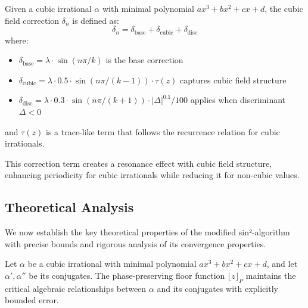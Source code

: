 \begin{definition}
Given a cubic irrational $\alpha$ with minimal polynomial $ax^3 + bx^2 + cx + d$, the cubic field correction $\delta_n$ is defined as:
\begin{equation}
\delta_n = \delta_{\text{base}} + \delta_{\text{cubic}} + \delta_{\text{disc}}
\end{equation}
where:
\begin{itemize}
    \item $\delta_{\text{base}} = \lambda \cdot \sin(n\pi/k)$ is the base correction
    \item $\delta_{\text{cubic}} = \lambda \cdot 0.5 \cdot \sin(n\pi/(k-1)) \cdot \tau(z)$ captures cubic field structure
    \item $\delta_{\text{disc}} = \lambda \cdot 0.3 \cdot \sin(n\pi/(k+1)) \cdot |\Delta|^{0.1}/100$ applies when discriminant $\Delta < 0$
\end{itemize}
and $\tau(z)$ is a trace-like term that follows the recurrence relation for cubic irrationals.
\end{definition}

This correction term creates a resonance effect with cubic field structure, enhancing periodicity for cubic irrationals while reducing it for non-cubic values.

\subsection{Theoretical Analysis}

We now establish the key theoretical properties of the modified sin²-algorithm with precise bounds and rigorous analysis of its convergence properties.

\begin{lemma}\label{lem:algebraic_preservation}
Let $\alpha$ be a cubic irrational with minimal polynomial $ax^3 + bx^2 + cx + d$, and let $\alpha', \alpha''$ be its conjugates. The phase-preserving floor function $\lfloor z \rfloor_P$ maintains the critical algebraic relationships between $\alpha$ and its conjugates with explicitly bounded error.
\end{lemma}

